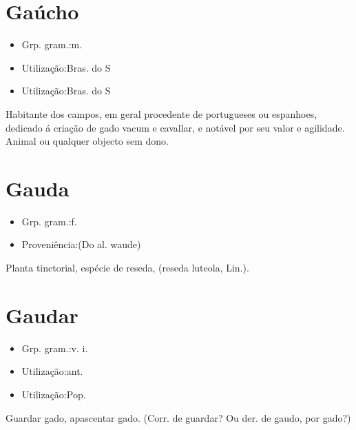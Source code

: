 \section{Gaúcho}
\begin{itemize}
\item {Grp. gram.:m.}
\end{itemize}
\begin{itemize}
\item {Utilização:Bras. do S}
\end{itemize}
\begin{itemize}
\item {Utilização:Bras. do S}
\end{itemize}
Habitante dos campos, em geral procedente de portugueses ou espanhoes, dedicado á criação de gado vacum e cavallar, e notável por seu valor e agilidade.
Animal ou qualquer objecto sem dono.
\section{Gauda}
\begin{itemize}
\item {Grp. gram.:f.}
\end{itemize}
\begin{itemize}
\item {Proveniência:(Do al. \textunderscore waude\textunderscore )}
\end{itemize}
Planta tinctorial, espécie de reseda, (\textunderscore reseda luteola\textunderscore , Lin.).
\section{Gaudar}
\begin{itemize}
\item {Grp. gram.:v. i.}
\end{itemize}
\begin{itemize}
\item {Utilização:ant.}
\end{itemize}
\begin{itemize}
\item {Utilização:Pop.}
\end{itemize}
Guardar gado, apascentar gado.
(Corr. de \textunderscore guardar\textunderscore ? Ou der. de \textunderscore gaudo\textunderscore , por \textunderscore gado\textunderscore ?)
